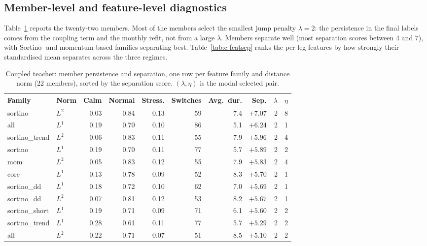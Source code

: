 \subsection*{Member-level and feature-level diagnostics}
Table~\ref{tab:c-members} reports the twenty-two members. Most of the members select the smallest
jump penalty $\lambda=2$: the persistence in the final labels comes from the coupling term
and the monthly refit, not from a large $\lambda$. Members separate well (most separation
scores between $4$ and $7$), with Sortino- and momentum-based families separating
best. Table~\ref{tab:c-featsep} ranks the per-leg features by how strongly their
standardised mean separates across the three regimes.

\begin{table}[H]
\centering\small
\caption{Coupled teacher: member persistence and separation, one row per feature family and
distance norm (22 members), sorted by the separation score. $(\lambda,\eta)$ is the modal
selected pair.}
\label{tab:c-members}
\begin{adjustbox}{center,max width=\linewidth}
\begin{tabular}{llrrrrrrrr}
\toprule
Family & Norm & Calm & Normal & Stress. & Switches & Avg.\ dur. & Sep. & $\lambda$ & $\eta$ \\
\midrule
sortino & $L^2$ & 0.03 & 0.84 & 0.13 & 59 & \phantom{0}7.4 & $+7.07$ & 2 & 8 \\
all & $L^1$ & 0.19 & 0.70 & 0.10 & 86 & \phantom{0}5.1 & $+6.24$ & 2 & 1 \\
sortino\_trend & $L^2$ & 0.06 & 0.83 & 0.11 & 55 & \phantom{0}7.9 & $+5.96$ & 2 & 4 \\
sortino & $L^1$ & 0.19 & 0.70 & 0.11 & 77 & \phantom{0}5.7 & $+5.89$ & 2 & 2 \\
mom & $L^2$ & 0.05 & 0.83 & 0.12 & 55 & \phantom{0}7.9 & $+5.83$ & 2 & 4 \\
core & $L^1$ & 0.13 & 0.78 & 0.09 & 52 & \phantom{0}8.3 & $+5.70$ & 2 & 1 \\
sortino\_dd & $L^1$ & 0.18 & 0.72 & 0.10 & 62 & \phantom{0}7.0 & $+5.69$ & 2 & 1 \\
sortino\_dd & $L^2$ & 0.07 & 0.81 & 0.12 & 53 & \phantom{0}8.2 & $+5.67$ & 2 & 1 \\
sortino\_short & $L^1$ & 0.19 & 0.71 & 0.09 & 71 & \phantom{0}6.1 & $+5.60$ & 2 & 2 \\
sortino\_trend & $L^1$ & 0.28 & 0.61 & 0.11 & 77 & \phantom{0}5.7 & $+5.29$ & 2 & 2 \\
all & $L^2$ & 0.22 & 0.71 & 0.07 & 51 & \phantom{0}8.5 & $+5.10$ & 2 & 2 \\

\end{tabular}
\end{adjustbox}
\end{table}

